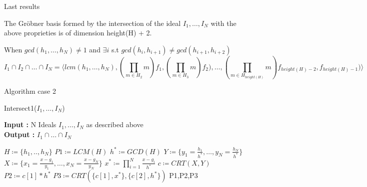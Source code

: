 \documentclass{beamer}
\begin{document}
\begin{frame}{Last results}
    \begin{conjecture}
        The Gröbner basis formed by the intersection of the ideal $I_{1},\dots,I_{N}$ with the above proprieties is of dimension height(H) + 2.
    \end{conjecture}
    
    
    \begin{theorem}
         When $gcd(h_{1},\dots,h_{N}) \neq 1$ and $\exists i$ s.t $gcd(h_{i},h_{i+1}) \neq gcd(h_{i+1},h_{i+2})$
        \begin{displaymath}
            I_{1} \cap I_{2} \cap \dots \cap I_{N} = \langle lcm(h_{1},\dots,h_{N}),(\prod_{m \in H_{2}} m)f_{1},(\prod_{m \in H_{3}} m)f_{2}),\dots,(\prod_{m \in H_{height(H)}} m)f_{height(H)-2},f_{height(H)-1})\rangle
        \end{displaymath}
    \end{theorem}
    
\end{frame}


\begin{frame}{Algorithm case 2}
    \begin{algorithm}[H]
    \caption{Intersect1($I_{1},\dots,I_{N}$)}\label{alg:intersect-n-ideals-equal-gcd}
    \textbf{Input : } N Ideals $I_{1},\dots,I_{N}$ as described above \\
    \textbf{Output : }$I_{1} \cap \dots\cap I_ {N}$
\begin{algorithmic}
    \State $H \coloneqq \{h_{1},..,h_{N}\}$
    \State $P1 \coloneqq LCM(H)$
    \State $h^{*} \coloneqq GCD(H)$
    \State $Y\coloneqq \{y_{1}= \frac{h_{1}}{h^{*}},\dots,y_{N}= \frac{h_{N}}{h^{*}}\}$
    \State $X \coloneqq \{x_{1} = \frac{x-g_{1}}{y_{1}},\dots,x_{N} =\frac{x-g_{N}}{y_{N}}\}$
    \State $x^{*} \coloneqq \prod^{N}_{i=1} \frac{x-g_{i}}{h^{*}}$
    \State $c\coloneqq CRT(X,Y)$
    \State $P2 \coloneqq c[1]*h^{*}$ 
    \State $P3 \coloneqq CRT(\{c[1],x^{*}\},\{c[2], h^{*}\})$
    \State \Return P1,P2,P3
\end{algorithmic}
\end{algorithm}
\end{frame}
\end{document}
